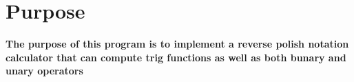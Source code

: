 \documentclass{article}
\title{\ASSIGNMENT}
\author{\NAME}
\date{\CLASS}
\begin{document}
\pagestyle{fancy}
\fancyfoot{}
\fancyhead{}
\fancyfoot[L]{\ASSIGNMENT\ -- \CLASS\ -- \NAME}
\fancyfoot[R]{\thepage}

\maketitle



\section*{Purpose}

\textbf{The purpose of this program is to implement a reverse polish notation calculator that can compute trig functions as well as both bunary and unary operators}
\end{document}
